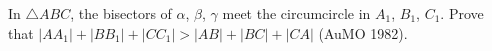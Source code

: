 In $\triangle ABC$, the bisectors of $\alpha$, $\beta$, $\gamma$ meet the circumcircle in $A_1$, $B_1$, $C_1$. Prove that $|AA_1| + |BB_1| + |CC_1| > |AB| + |BC| + |CA|$ (AuMO 1982).
